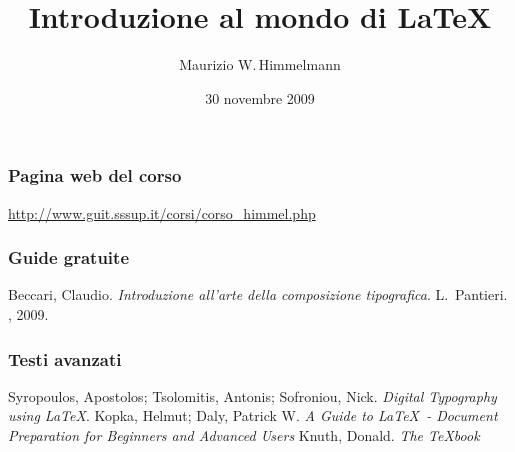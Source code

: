 \documentclass[svgnames,%
	ucs,%
	pdftex]{guitbeamer}
\title[Introduzione al mondo di \LaTeX]{Introduzione al mondo di \LaTeX}
\author[Maurizio W.\,Himmelmann]{Maurizio W.\,Himmelmann}
\date{30 novembre 2009} %
\begin{document}
\frame{\titlepage}
\begin{frame}
  \frametitle{Pagina web del corso}
	\begin{center}
	  \large
		\url{http://www.guit.sssup.it/corsi/corso_himmel.php}
	\end{center}
\end{frame}
\begin{frame}
  \frametitle{Guide gratuite}
	\begin{thebibliography}{Wel66}
			Beccari, Claudio.
			\newblock \textit{Introduzione all'arte della composizione tipografica}.
			L.~Pantieri.
			, 2009.
	\end{thebibliography}
\end{frame}
\begin{frame}
  \frametitle{Testi avanzati}
	\begin{thebibliography}{Wel66}
			Syropoulos, Apostolos; Tsolomitis, Antonis; Sofroniou, Nick.
			\newblock \textit{Digital Typography using \LaTeX}.
			Kopka, Helmut; Daly, Patrick W.
			\newblock \textit{A Guide to \LaTeX\ - Document Preparation for
			Beginners and Advanced Users}
	  \bigskip
			Knuth, Donald.
			\newblock \textit{The \TeX book}
	\end{thebibliography}
\end{frame}
% 
\end{document}
